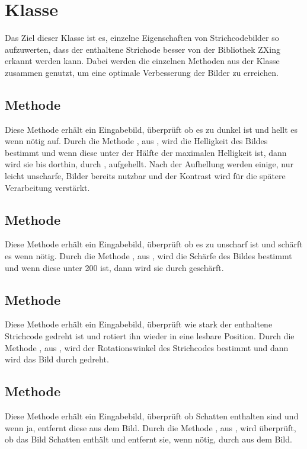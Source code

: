 \section{Klasse }
\writtenby{\dcauthornameriren}%
Das Ziel dieser Klasse ist es, einzelne Eigenschaften von Strichcodebilder so aufzuwerten, dass der enthaltene Strichode besser von der Bibliothek ZXing erkannt werden kann.
Dabei werden die einzelnen Methoden aus der Klasse  zusammen genutzt, um eine optimale Verbesserung der Bilder zu erreichen.


\subsection*{Methode }
Diese Methode erhält ein Eingabebild, überprüft ob es zu dunkel ist und hellt es wenn nötig auf.
Durch die Methode , aus , wird die Helligkeit des Bildes bestimmt und wenn diese unter der Hälfte der maximalen Helligkeit ist, dann wird sie bis dorthin, durch , aufgehellt.
Nach der Aufhellung werden einige, nur leicht unscharfe, Bilder bereits nutzbar und der Kontrast wird für die spätere Verarbeitung verstärkt.


\subsection*{Methode }
Diese Methode erhält ein Eingabebild, überprüft ob es zu unscharf ist und schärft es wenn nötig.
Durch die Methode , aus , wird die Schärfe des Bildes bestimmt und wenn diese unter 200 ist, dann wird sie durch  geschärft.


\subsection*{Methode }
Diese Methode erhält ein Eingabebild, überprüft wie stark der enthaltene Strichcode gedreht ist und rotiert ihn wieder in eine lesbare Position.
Durch die Methode , aus , wird der Rotationswinkel des Strichcodes bestimmt und dann wird das Bild durch  gedreht.


\subsection*{Methode }
Diese Methode erhält ein Eingabebild, überprüft ob Schatten enthalten sind und wenn ja, entfernt diese aus dem Bild.
Durch die Methode , aus , wird überprüft, ob das Bild Schatten enthält und entfernt sie, wenn nötig, durch  aus dem Bild.
 

